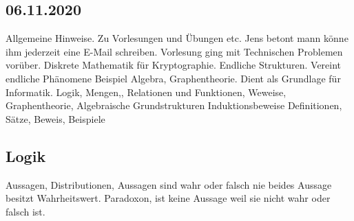 \documentclass{article}
\begin{document}
	
	
	\subsection*{06.11.2020}
	Allgemeine Hinweise. Zu Vorlesungen und Übungen etc.
	Jens betont mann könne ihm jederzeit eine E-Mail schreiben.
	Vorlesung ging mit Technischen Problemen vorüber.
	Diskrete Mathematik für Kryptographie. Endliche Strukturen.
	Vereint endliche Phänomene Beispiel Algebra, Graphentheorie. Dient als Grundlage für Informatik. \linebreak
	Logik, Mengen,, Relationen und Funktionen, Weweise, Graphentheorie, Algebraische Grundstrukturen \linebreak
	Induktionsbeweise
	Definitionen, Sätze, Beweis, Beispiele
	\subsection*{Logik}
	Aussagen, Distributionen, Aussagen sind wahr oder falsch nie beides \linebreak
	Aussage besitzt Wahrheitswert. Paradoxon, ist keine Aussage weil sie nicht wahr oder falsch ist.
	
\end{document}
